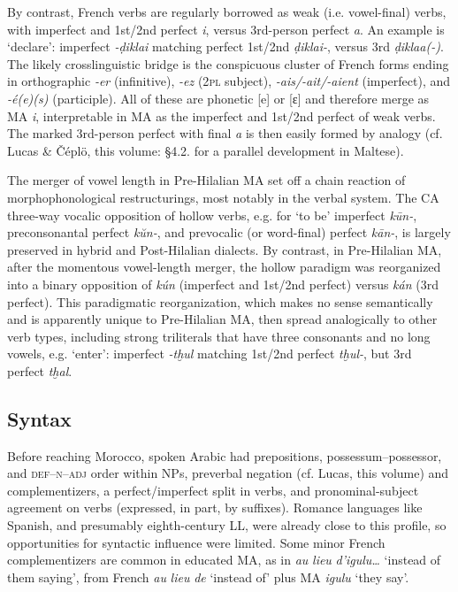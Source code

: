 \documentclass[output=paper]{langsci/langscibook}
\begin{document}
By contrast, French verbs are regularly borrowed as weak (i.e. vowel-final) verbs, with imperfect and 1st/2nd perfect \textit{i}, versus 3rd-person perfect \textit{a}. An example is ‘declare’: imperfect \textit{\nobreakdash-ḍikla{\R}i} matching perfect 1st/2nd \textit{ḍikla{\R}i-}, versus 3rd \textit{ḍikla{\R}a(-)}. The likely crosslinguistic bridge is the conspicuous cluster of French forms ending in orthographic \textit{{}-er} (infinitive), \textit{{}-ez} (2\textsc{pl} subject), \textit{{}-ais/-ait/-aient} (imperfect), and \textit{-é(e)(s)} (participle). All of these are phonetic [e] or [ɛ] and therefore merge as MA \textit{i}, interpretable in MA as the imperfect and 1st/2nd perfect of weak verbs. The marked 3rd-person perfect with final \textit{a} is then easily formed by analogy  (cf. Lucas \& Čéplö, this volume: §4.2. for a parallel development in Maltese).

The merger of vowel length in Pre-Hilalian MA set off a chain reaction of morphophonological restructurings, most notably in the verbal system. The CA three-way vocalic opposition of hollow verbs, e.g. for ‘to be’ imperfect \textit{kūn-}, preconsonantal perfect \textit{kŭn-}, and prevocalic (or word-final) perfect \textit{kān-}, is largely preserved in hybrid and Post-Hilalian dialects. By contrast, in Pre-Hilalian MA, after the momentous vowel-length merger, the hollow paradigm was reorganized into a binary opposition of \textit{kún} (imperfect and 1st/2nd perfect) versus \textit{kán} (3rd perfect). This paradigmatic reorganization, which makes no sense semantically and is apparently unique to Pre-Hilalian MA, then spread analogically to other verb types, including strong triliterals that have three consonants and no long vowels, e.g. ‘enter’: imperfect \textit{-tḫul} matching 1st/2nd perfect \textit{tḫul-}, but 3rd perfect \textit{tḫal}.

\subsection{Syntax}

Before reaching Morocco, spoken Arabic had prepositions, possessum--possessor, and \textsc{def--n--adj} order within NPs, preverbal negation (cf. Lucas, this volume) and complementizers, a perfect/imperfect split in verbs, and pronominal-subject agreement on verbs (expressed, in part, by suffixes). Romance languages like Spanish, and presumably eighth-century LL, were already close to this profile, so opportunities for syntactic influence were limited. Some minor French complementizers are common in educated MA, as in \textit{au} \textit{lieu} \textit{d’igulu…} ‘instead of them saying’, from French \textit{au} \textit{lieu} \textit{de} ‘instead of’ plus MA \textit{igulu} ‘they say’. 
\end{document}
